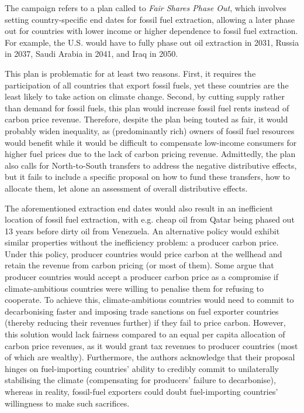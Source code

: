 \documentclass[12pt,english]{article}
\begin{document}
The campaign refers to a plan called to \textit{Fair Shares Phase Out}, which involves setting country-specific end dates for fossil fuel extraction,\citep{civil_society_equity_review_equitable_2023,calverley_phaseout_2022} allowing a later phase out for countries with lower income or higher dependence to fossil fuel extraction. For example, the U.S. would have to fully phase out oil extraction in 2031, Russia in 2037, Saudi Arabia in 2041, and Iraq in 2050.

This plan is problematic for at least two reasons. First, it requires the participation of all countries that export fossil fuels, yet these countries are the least likely to take action on climate change. Second, by cutting supply rather than demand for fossil fuels, this plan would increase fossil fuel rents instead of carbon price revenue. Therefore, despite the plan being touted as fair, it would probably widen inequality, as (predominantly rich) owners of fossil fuel resources would benefit while it would be difficult to compensate low-income consumers for higher fuel prices due to the lack of carbon pricing revenue. Admittedly, the plan also calls for North-to-South transfers to address the negative distributive effects, but it fails to include a specific proposal on how to fund these transfers, how to allocate them, let alone an assessment of overall distributive effects. 

The aforementioned extraction end dates would also result in an inefficient location of fossil fuel extraction,\citep{coulomb_bad_2025} with e.g. cheap oil from Qatar being phased out 13 years before dirty oil from Venezuela. An alternative policy would exhibit similar properties without the inefficiency problem: a producer carbon price. Under this policy, producer countries would price carbon at the wellhead and retain the revenue from carbon pricing (or most of them). Some argue that producer countries would accept a producer carbon price as a compromise if climate-ambitious countries were willing to penalise them for refusing to cooperate. To achieve this, climate-ambitious countries would need to commit to decarbonising faster and imposing trade sanctions on fuel exporter countries (thereby reducing their revenues further) if they fail to price carbon.\citep{peszko_cooperative_2019} However, this solution would lack fairness compared to an equal per capita allocation of carbon price revenues, as it would grant tax revenues to producer countries (most of which are wealthy). Furthermore, the authors acknowledge that their proposal hinges on fuel-importing countries' ability to credibly commit to unilaterally stabilising the climate (compensating for producers' failure to decarbonise), whereas in reality, fossil-fuel exporters could doubt fuel-importing countries' willingness to make such sacrifices.
\end{document}
